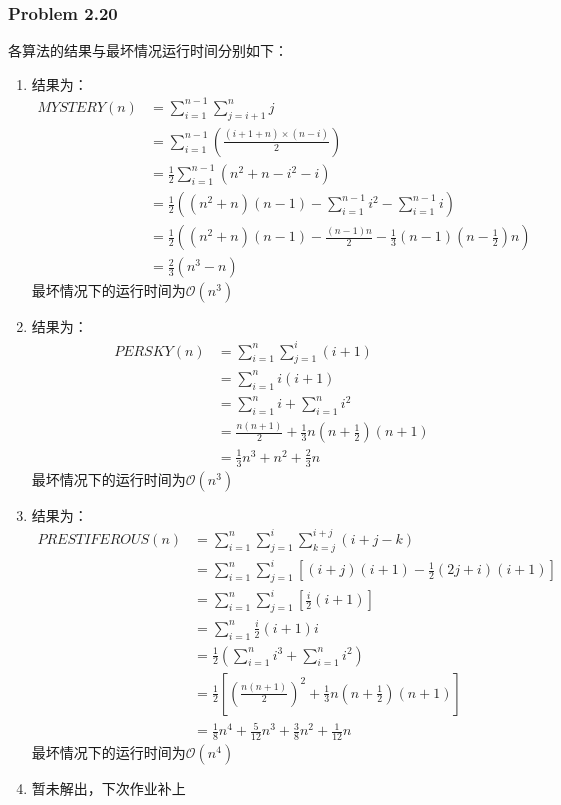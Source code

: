\documentclass[UTF8,12pt]{article} %
\makeatletter
\theoremstyle{definition}
\newenvironment{proof}[1][\protect\proofname]{\par
\normalfont\topsep6\p@\@plus6\p@\relax
\trivlist
\itemindent\parindent
\item[\hskip\labelsep
\scshape
#1]\ignorespaces
}{%
\endtrivlist\@endpefalse
}
\renewcommand{\proofname}{\it{\textbf{证明}}}
\makeatother
\begin{document}
\subsubsection*{Problem 2.20}
\begin{proof}[\textbf{解答}]
	各算法的结果与最坏情况运行时间分别如下：
	\begin{enumerate}[1)]
		\item 结果为：\[\begin{split}
		MYSTERY(n) &= \sum^{n-1}_{i=1}\sum^{n}_{j=i+1}j\\
		&= \sum^{n-1}_{i=1}\left(\displaystyle\frac{(i+1+n)\times (n-i)}{2}\right)\\
		&= \frac{1}{2}\sum^{n-1}_{i=1}(n^{2}+n-i^{2}-i)\\
		&=\frac{1}{2}\left( (n^{2}+n)(n-1) -\sum^{n-1}_{i=1}i^{2}-\sum^{n-1}_{i=1}i \right)\\
		&= \frac{1}{2}\left( (n^{2}+n)(n-1) -\displaystyle\frac{(n-1)n}{2}- \displaystyle\frac{1}{3}(n-1)(n-\frac{1}{2})n \right)\\
		&= \frac{2}{3}(n^{3}-n)
		\end{split}
		\]最坏情况下的运行时间为$\mathcal{O}(n^{3})$

		\item 结果为：\[\begin{split}
		PERSKY(n) &= \sum^{n}_{i=1}\sum^{i}_{j=1}(i+1)\\
		&= \sum^{n}_{i=1}i(i+1)\\
		&= \sum^{n}_{i=1} i + \sum^{n}_{i=1} i^{2}\\
		&= \frac{n(n+1)}{2} + \frac{1}{3}n(n+\frac{1}{2})(n+1)\\
		&= \frac{1}{3}n^{3}+n^{2}+\frac{2}{3}n
		\end{split}\]最坏情况下的运行时间为$\mathcal{O}(n^{3})$

		\item 结果为：\[\begin{split}
		PRESTIFEROUS(n) &= \sum^{n}_{i=1}\sum^{i}_{j=1}\sum^{i+j}_{k=j}(i+j-k)\\
		&= \sum^{n}_{i=1}\sum^{i}_{j=1}\left[(i+j)(i+1)-\frac{1}{2}(2j+i)(i+1)\right]\\
		&= \sum^{n}_{i=1}\sum^{i}_{j=1} \left[ \frac{i}{2}(i+1)\right]\\
		&= \sum^{n}_{i=1}\frac{i}{2}(i+1)i\\
		&= \frac{1}{2}\left( \sum^{n}_{i=1}i^{3}+\sum^{n}_{i=1}i^{2}\right)\\
		&= \frac{1}{2}\left[ \left( \frac{n(n+1)}{2}\right)^{2}+\frac{1}{3}n(n+\frac{1}{2})(n+1)\right]\\
		&= \frac{1}{8}n^{4}+\frac{5}{12}n^{3}+\frac{3}{8}n^{2}+\frac{1}{12}n
		\end{split}\]最坏情况下的运行时间为$\mathcal{O}(n^{4})$
		\item 暂未解出，下次作业补上

	\end{enumerate}
\end{proof}
\end{document}
